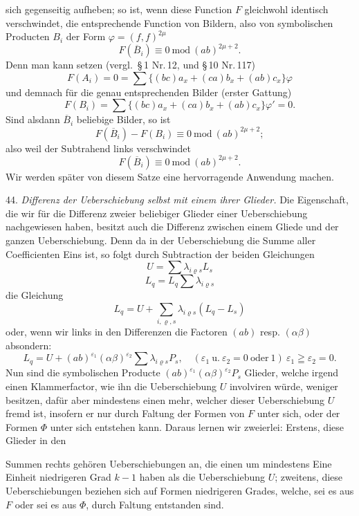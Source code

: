 \documentclass[11pt]{article}
\providecommand{\weberpage}[1]{}
\providecommand{\weq}[2]{\begin{equation}\tag{#1}#2\end{equation}}
\let\Phi\varPhi
\begin{document}
\weberpage{47}
sich gegenseitig aufheben; so ist, wenn diese Function $F$ gleichwohl
identisch verschwindet, die entsprechende Function von Bildern, also von
symbolischen Producten $B_i$ der Form $\varphi=(f,f)^{2\mu}$
\[
F(\overline{B}_i)\equiv 0\ \mathrm{mod}\ (ab)^{2\mu+2}.
\]
\grqq{} Denn man kann setzen (vergl.\ \S\,1 Nr.\,12, und \S\,10 Nr.\,117)
\[
F(A_i)=0=\sum\{(bc)a_x+(ca)b_x+(ab)c_x\}\varphi
\]
und demnach für die genau entsprechenden Bilder (erster Gattung)
\[
F(B_i)=\sum\{(bc)a_x+(ca)b_x+(ab)c_x\}\varphi'=0.
\]
Sind alsdann $\overline{B}_i$ beliebige Bilder, so ist
\[
F(\overline{B}_i)-F(B_i)\equiv 0\ \mathrm{mod}\ (ab)^{2\mu+2};
\]
also weil der Subtrahend links verschwindet
\weq{3}{F(\overline{B}_i)\equiv 0\ \mathrm{mod}\ (ab)^{2\mu+2}.}
Wir werden später von diesem Satze eine hervorragende Anwendung machen.

44. \textit{Differenz der Ueberschiebung selbst mit einem ihrer Glieder.}
Die Eigenschaft, die wir für die Differenz zweier beliebiger Glieder einer
Ueberschiebung nachgewiesen haben, besitzt auch die Differenz zwischen einem
Gliede und der ganzen Ueberschiebung. Denn da in der Ueberschiebung die
Summe aller Coefficienten Eins ist, so folgt durch Subtraction der beiden
Gleichungen
\[
U=\sum\lambda_{i\varrho s}L_s
\]
\[
L_q=L_q\sum\lambda_{i\varrho s}
\]
die Gleichung
\[
L_q=U+\sum_{i,\varrho,s}\lambda_{i\varrho s}(L_q-L_s)
\]
oder, wenn wir links in den Differenzen die Factoren $(ab)$ resp.
$(\alpha\beta)$ absondern:
\weq{I}{L_q=U+(ab)^{\varepsilon_1}(\alpha\beta)^{\varepsilon_2}\sum\lambda_{i\varrho s}P_s,\quad (\varepsilon_1\ \mathrm{u.}\ \varepsilon_2=0\ \mathrm{oder}\ 1)\ \varepsilon_1\geqq\varepsilon_2=0.}
Nun sind die symbolischen Producte $(ab)^{\varepsilon_1}(\alpha\beta)^{\varepsilon_2}P_s$
Glieder, welche irgend einen Klammerfactor, wie ihn die Ueberschiebung $U$
involviren würde, weniger besitzen, dafür aber mindestens einen mehr, welcher
dieser Ueberschiebung $U$ fremd ist, insofern er nur durch Faltung der Formen
von $F$ unter sich, oder der Formen $\Phi$ unter sich entstehen kann. Daraus
lernen wir zweierlei: Erstens, diese Glieder in den


\weberpage{48}
Summen rechts gehören Ueberschiebungen an, die einen um mindestens Eine
Einheit niedrigeren Grad $k-1$ haben als die Ueberschiebung $U$; zweitens,
diese Ueberschiebungen beziehen sich auf Formen niedrigeren Grades, welche,
sei es aus $F$ oder sei es aus $\Phi$, durch Faltung entstanden sind.
\end{document}
